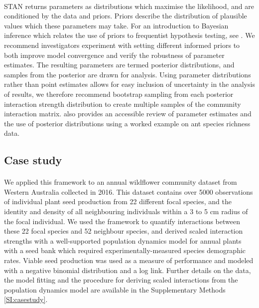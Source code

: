 \documentclass[a4,12pt]{article}
\begin{document}
        \paragraph{}
        STAN returns parameters as distributions which maximise the likelihood, and are conditioned by the data and priors. Priors describe the distribution of plausible values which these parameters may take. For an introduction to Bayesian inference which relates the use of priors to frequentist hypothesis testing, see \textcite{Ellison1996}. We recommend investigators experiment with setting different informed priors to both improve model convergence and verify the robustness of parameter estimates. The resulting parameters are termed posterior distributions, and samples from the posterior are drawn for analysis. Using parameter distributions rather than point estimates allows for easy inclusion of uncertainty in the analysis of results, we therefore recommend bootstrap sampling from each posterior interaction strength distribution to create multiple samples of the community interaction matrix. \textcite{Ellison2004} also provides an accessible review of parameter estimates and the use of posterior distributions using a worked example on ant species richness data.


    \subsection{Case study}

       \paragraph{}
        We applied this framework to an annual wildflower community dataset from Western Australia collected in 2016. This dataset contains over 5000 observations of individual plant seed production from 22 different focal species, and the identity and density of all neighbouring individuals within a 3 to 5 cm radius of the focal individual. We used the framework to quantify interactions between these 22 focal species and 52 neighbour species, and derived scaled interaction strengths with a well-supported population dynamics model for annual plants with a seed bank \parencite{Levine2009, Bimler2018} which required experimentally-measured species demographic rates. Viable seed production was used as a measure of performance and modeled with a negative binomial distribution and a log link.
        Further details on the data, the model fitting and the procedure for deriving scaled interactions from the population dynamics model are available in the Supplementary Methods \ref{SI:casestudy}.
\end{document}
